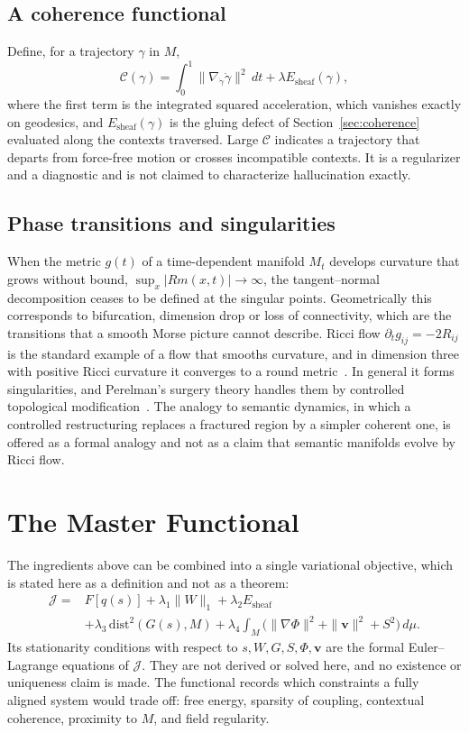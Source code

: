 \documentclass[11pt,a4paper]{article}
\theoremstyle{definition}
\theoremstyle{remark}
\newcommand{\dist}{\mathrm{dist}}
\begin{document}
\subsection{A coherence functional}

Define, for a trajectory $\gamma$ in $M$,
\[
\mathcal{C}(\gamma)=\int_0^1\|\nabla_{\dot\gamma}\dot\gamma\|^2\,dt+\lambda E_{\mathrm{sheaf}}(\gamma),
\]
where the first term is the integrated squared acceleration, which
vanishes exactly on geodesics, and $E_{\mathrm{sheaf}}(\gamma)$ is the gluing
defect of Section~\ref{sec:coherence} evaluated along the contexts
traversed. Large $\mathcal{C}$ indicates a trajectory that departs from
force-free motion or crosses incompatible contexts. It is a regularizer and
a diagnostic and is not claimed to characterize hallucination exactly.

\subsection{Phase transitions and singularities}

When the metric $g(t)$ of a time-dependent manifold $M_t$ develops curvature
that grows without bound, $\sup_x|Rm(x,t)|\to\infty$, the tangent--normal
decomposition ceases to be defined at the singular points. Geometrically this
corresponds to bifurcation, dimension drop or loss of connectivity, which are
the transitions that a smooth Morse picture cannot describe. Ricci flow
$\partial_tg_{ij}=-2R_{ij}$ is the standard example of a flow that smooths
curvature, and in dimension three with positive Ricci curvature it converges
to a round metric~\cite{hamilton1982three}. In general it forms singularities, and Perelman's
surgery theory handles them by controlled topological modification~\cite{perelman2002entropy}.
The analogy to semantic dynamics, in which a controlled restructuring
replaces a fractured region by a simpler coherent one, is offered as a
formal analogy and not as a claim that semantic manifolds evolve by Ricci
flow.

\section{The Master Functional}

The ingredients above can be combined into a single variational objective,
which is stated here as a definition and not as a theorem:
\begin{align*}
\mathcal{J}={}&F[q(s)]+\lambda_1\|W\|_1+\lambda_2E_{\mathrm{sheaf}}\\
&+\lambda_3\,\dist^2(G(s),M)+\lambda_4\int_M\bigl(\|\nabla\Phi\|^2+\|\mathbf{v}\|^2+S^2\bigr)\,d\mu .
\end{align*}
Its stationarity conditions with respect to $s,W,G,S,\Phi,\mathbf{v}$ are the
formal Euler--Lagrange equations of $\mathcal{J}$. They are not derived or
solved here, and no existence or uniqueness claim is made. The functional
records which constraints a fully aligned system would trade off: free energy,
sparsity of coupling, contextual coherence, proximity to $M$, and field
regularity.
\end{document}
